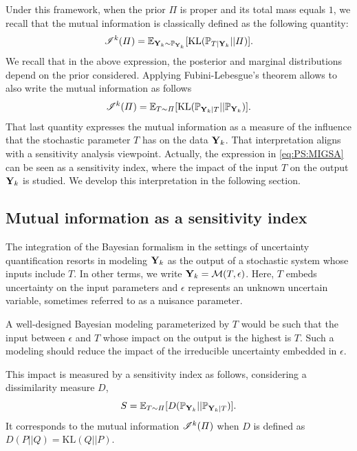 Under this framework, when the prior $\varPi$ is proper and its total mass equals $1$, we recall that the mutual information is classically defined as the following quantity:
    \begin{equation}
        \mathscr{I}^k(\varPi) =  \mathbb{E}_{\mathbf{Y}_k\sim \mathbb{P}_{\mathbf{Y}_k}}[\text{KL}(\mathbb{P}_{T|\mathbf{Y}_k}||\varPi)] .
    \end{equation}
We recall that in the above expression, the posterior and marginal distributions depend on the prior considered. %
Applying Fubini-Lebesgue's theorem allows to also write the mutual information as follows
    \begin{equation}\label{eq:PS:MIGSA}
        \mathscr{I}^k(\varPi) = \mathbb{E}_{T\sim\varPi}[\text{KL}(\mathbb{P}_{\mathbf{Y}_k|T}||\mathbb{P}_{\mathbf{Y}_k}) ].
    \end{equation}
That last quantity expresses the mutual information as 
a measure of the influence that the stochastic parameter $T$ has on the data $\mathbf{Y}_k$.
That interpretation aligns with a sensitivity analysis viewpoint. Actually, the expression in \cref{eq:PS:MIGSA} can be seen as a sensitivity index, where the impact of the input $T$ on the output $\mathbf{Y}_k$ is studied. We develop this interpretation in the following section.




\subsection{Mutual information as a sensitivity index}

The integration of the Bayesian formalism in the settings of uncertainty quantification resorts in modeling $\mathbf{Y}_k$ as the output of a stochastic system whose inputs include $T$. In other terms, we write $\mathbf{Y}_k=\mathcal{M}(T,\epsilon)$. Here, $T$ embeds uncertainty on  the input parameters and $\epsilon$ represents an unknown uncertain variable, sometimes referred to as a nuisance parameter.

A well-designed Bayesian modeling parameterized by $T$ would be such that the input between $\epsilon$ and $T$ whose impact on the output
is the highest is $T$. Such a modeling should reduce the impact of the irreducible uncertainty embedded in $\epsilon$.

This impact is measured by a sensitivity index as follows, considering a dissimilarity measure $D$, 
    \begin{equation}
        S = \mathbb{E}_{T\sim\varPi}[ D(\mathbb{P}_{\mathbf{Y}_k}||\mathbb{P}_{\mathbf{Y}_k|T}) ].
    \end{equation}
It corresponds to the mutual information $\mathscr{I}^k(\varPi)$ when $D$ is defined as $D(P||Q)=\text{KL}(Q||P)$.

